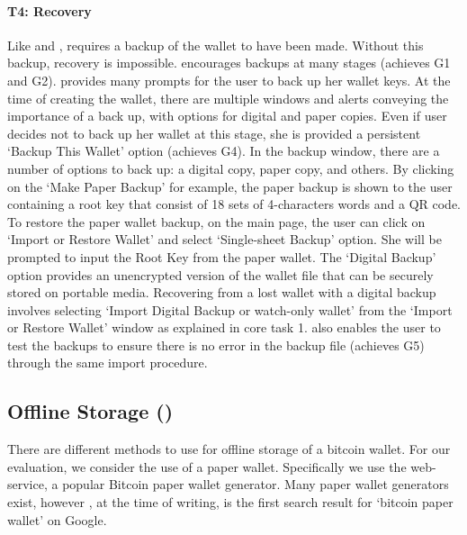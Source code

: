 \paragraph{T4: Recovery} Like \bitcoinclient and \multibit, \armory requires a backup of the wallet to have been made. Without this backup, recovery is impossible. \armory encourages backups at many stages (achieves G1 and G2). \armory provides many prompts for the user to back up her wallet keys. At the time of creating the wallet, there are multiple windows and alerts conveying the importance of a back up, with options for digital and paper copies. Even if user decides not to back up her wallet at this stage, she is provided a persistent `Backup This Wallet' option (achieves G4). In the backup window, there are a number of options to back up: a digital copy, paper copy, and others. By clicking on the `Make Paper Backup' for example, the paper backup is shown to the user containing a root key that consist of 18 sets of 4-characters words and a QR code. To restore the paper wallet backup, on the main page, the user can click on `Import or Restore Wallet' and select `Single-sheet Backup' option. She will be prompted to input the Root Key from the paper wallet. The `Digital Backup' option provides an unencrypted version of the wallet file that can be securely stored on portable media. Recovering from a lost wallet with a digital backup involves selecting `Import Digital Backup or watch-only wallet' from the `Import or Restore Wallet' window as explained in core task 1. \armory also enables the user to test the backups to ensure there is no error in the backup file (achieves G5) through the same import procedure.

\subsection{Offline Storage (\paper)}
There are different methods to use for offline storage of a bitcoin wallet. For our evaluation, we consider the use of a paper wallet. Specifically we use the \paper web-service, a popular Bitcoin paper wallet generator. Many paper wallet generators exist, however \paper, at the time of writing, is the first search result for `bitcoin paper wallet' on Google.

